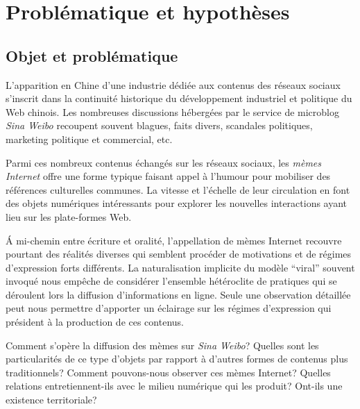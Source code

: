 \chapter*{Problématique et hypothèses}




\section*{Objet et problématique} 

L'apparition en Chine d'une industrie dédiée aux contenus des réseaux sociaux s'inscrit dans la continuité historique du développement industriel et politique du Web chinois. Les nombreuses discussions hébergées par le service de microblog \textit{Sina Weibo} recoupent souvent blagues, faits divers, scandales politiques, marketing politique et commercial, etc.

Parmi ces nombreux contenus échangés sur les réseaux sociaux, les \textit{mèmes Internet} offre une forme typique faisant appel à l'humour pour mobiliser des références culturelles communes. La vitesse et l'échelle de leur circulation en font des objets numériques intéressants pour explorer les nouvelles interactions ayant lieu sur les plate-formes Web. 

\'A mi-chemin entre écriture et oralité, l’appellation de mèmes Internet recouvre pourtant des réalités diverses qui semblent procéder de motivations et de régimes d'expression forts différents. La naturalisation implicite du modèle ``viral'' souvent invoqué nous empêche de considérer l'ensemble hétéroclite de pratiques qui se déroulent lors la diffusion d'informations en ligne. Seule une observation détaillée peut nous permettre d'apporter un éclairage sur les régimes d'expression qui président à la production de ces contenus.

Comment s'opère la diffusion des mèmes sur \textit{Sina Weibo}? Quelles sont les particularités de ce type d'objets par rapport à d'autres formes de contenus plus traditionnels? Comment pouvons-nous observer ces mèmes Internet? Quelles relations entretiennent-ils avec le milieu numérique qui les produit? Ont-ils une existence territoriale?

